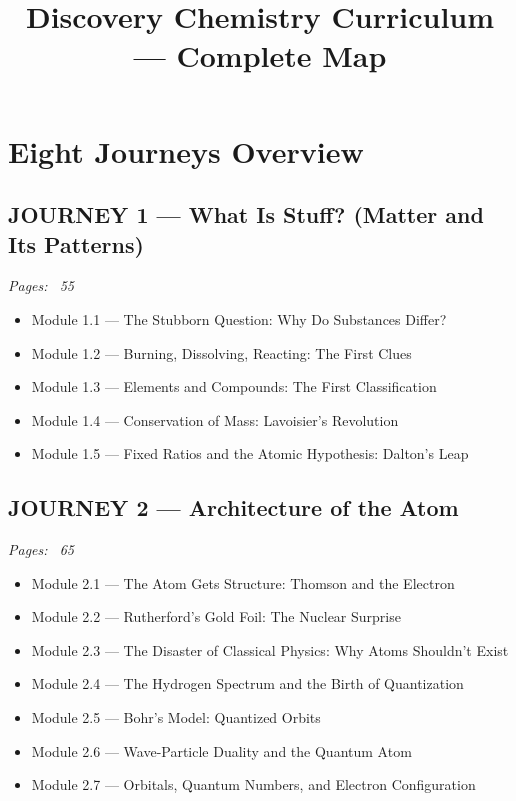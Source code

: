 \documentclass{article}
\title{Discovery Chemistry Curriculum — Complete Map}
\date{}
\begin{document}
\maketitle

\section*{Eight Journeys Overview}

\subsection*{JOURNEY 1 — What Is Stuff? (Matter and Its Patterns)}
\textit{Pages: ~55}

\begin{itemize}
    \item Module 1.1 — The Stubborn Question: Why Do Substances Differ?
    \item Module 1.2 — Burning, Dissolving, Reacting: The First Clues
    \item Module 1.3 — Elements and Compounds: The First Classification
    \item Module 1.4 — Conservation of Mass: Lavoisier's Revolution
    \item Module 1.5 — Fixed Ratios and the Atomic Hypothesis: Dalton's Leap
\end{itemize}

\subsection*{JOURNEY 2 — Architecture of the Atom}
\textit{Pages: ~65}

\begin{itemize}
    \item Module 2.1 — The Atom Gets Structure: Thomson and the Electron
    \item Module 2.2 — Rutherford's Gold Foil: The Nuclear Surprise
    \item Module 2.3 — The Disaster of Classical Physics: Why Atoms Shouldn't Exist
    \item Module 2.4 — The Hydrogen Spectrum and the Birth of Quantization
    \item Module 2.5 — Bohr's Model: Quantized Orbits
    \item Module 2.6 — Wave-Particle Duality and the Quantum Atom
    \item Module 2.7 — Orbitals, Quantum Numbers, and Electron Configuration
\end{itemize}
\end{document}
